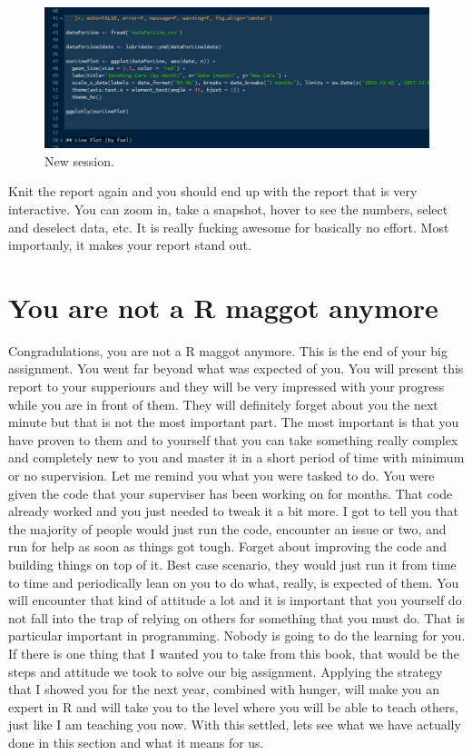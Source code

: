 \documentclass[]{book}
\begin{document}
\begin{figure}
\centering
\includegraphics{markdown14.png}
\caption{New session.}
\end{figure}

Knit the report again and you should end up with the report that is very interactive. You can zoom in, take a snapshot, hover to see the numbers, select and deselect data, etc. It is really fucking awesome for basically no effort. Most importanly, it makes your report stand out.

\hypertarget{you-are-not-a-r-maggot-anymore}{%
\section{You are not a R maggot anymore}\label{you-are-not-a-r-maggot-anymore}}

Congradulations, you are not a R maggot anymore. This is the end of your big assignment. You went far beyond what was expected of you. You will present this report to your supperiours and they will be very impressed with your progress while you are in front of them. They will definitely forget about you the next minute but that is not the most important part. The most important is that you have proven to them and to yourself that you can take something really complex and completely new to you and master it in a short period of time with minimum or no supervision. Let me remind you what you were tasked to do. You were given the code that your superviser has been working on for months. That code already worked and you just needed to tweak it a bit more. I got to tell you that the majority of people would just run the code, encounter an issue or two, and run for help as soon as things got tough. Forget about improving the code and building things on top of it. Best case scenario, they would just run it from time to time and periodically lean on you to do what, really, is expected of them. You will encounter that kind of attitude a lot and it is important that you yourself do not fall into the trap of relying on others for something that you must do. That is particular important in programming. Nobody is going to do the learning for you. If there is one thing that I wanted you to take from this book, that would be the steps and attitude we took to solve our big assignment. Applying the strategy that I showed you for the next year, combined with hunger, will make you an expert in R and will take you to the level where you will be able to teach others, just like I am teaching you now. With this settled, lets see what we have actually done in this section and what it means for us.
\end{document}
